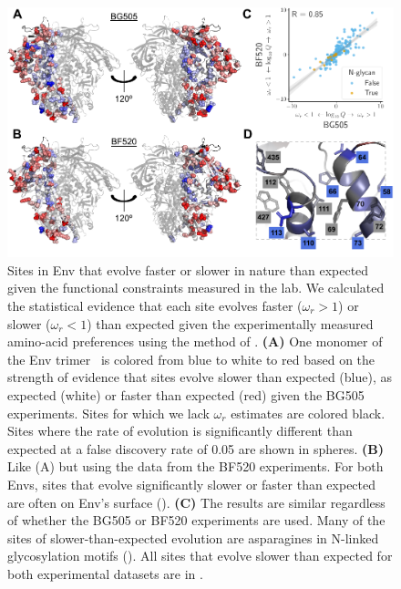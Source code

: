 \documentclass[9pt]{elife}
\begin{document}
\begin{figure}
\includegraphics[width=1.0\textwidth]{figures/omegabysite_structural_analysis/omegabysite_structural_analysis.pdf}
\caption{\label{fig:divsel}
Sites in Env that evolve faster or slower in nature than expected given the functional constraints measured in the lab.
We calculated the statistical evidence that each site evolves faster ($\omega_r > 1$) or slower ($\omega_r < 1$) than expected given the experimentally measured amino-acid preferences using the method of \citet{bloom2017identification}.
{\bf (A)}
One monomer of the Env trimer~\citep[PDB 5FYL;][]{stewart2016trimeric} is colored from blue to white to red based on the strength of evidence that sites evolve slower than expected (blue), as expected (white) or faster than expected (red) given the BG505 experiments.
Sites for which we lack $\omega_r$ estimates are colored black.
Sites where the rate of evolution is significantly different than expected at a false discovery rate of 0.05 are shown in spheres.
{\bf (B)}
Like (A) but using the data from the BF520 experiments.
For both Envs, sites that evolve significantly slower or faster than expected are often on Env's surface ().
{\bf (C)}
The results are similar regardless of whether the BG505 or BF520 experiments are used.
Many of the sites of slower-than-expected evolution are asparagines in N-linked glycosylation motifs ().
All sites that evolve slower than expected for both experimental datasets are in .
}
\end{figure}
\end{document}

